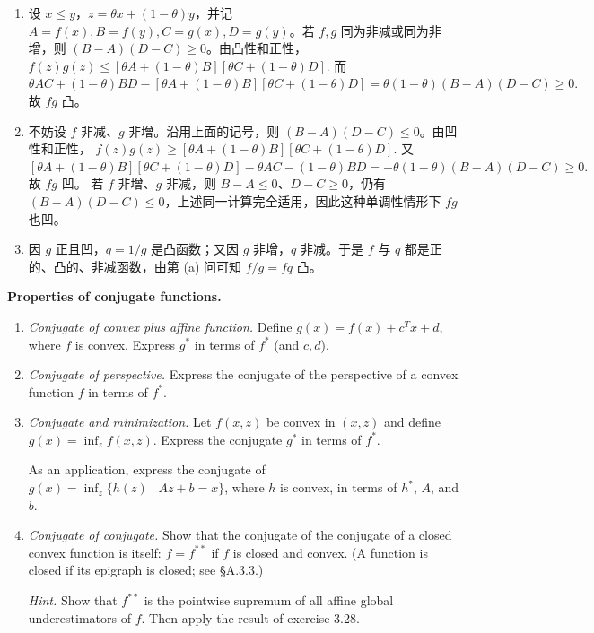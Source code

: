 \documentclass{ctexart}
\begin{document}
\begin{solution}
  \begin{enumerate}
    \item 设 $x\leq y$，$z=\theta x+(1-\theta)y$，并记
      $A=f(x),B=f(y),C=g(x),D=g(y)$。若 $f,g$ 同为非减或同为非增，则
      $(B-A)(D-C)\geq0$。由凸性和正性，
      \(
        f(z)g(z)\leq [\theta A+(1-\theta)B][\theta C+(1-\theta)D].
      \)
      而
      \(
        \theta AC+(1-\theta)BD
        -[\theta A+(1-\theta)B][\theta C+(1-\theta)D]
        =\theta(1-\theta)(B-A)(D-C)\geq0.
      \)
      故 $fg$ 凸。

    \item 不妨设 $f$ 非减、$g$ 非增。沿用上面的记号，则
      $(B-A)(D-C)\leq0$。由凹性和正性，
      \(
        f(z)g(z)\geq [\theta A+(1-\theta)B][\theta C+(1-\theta)D].
      \)
      又
      \(
        [\theta A+(1-\theta)B][\theta C+(1-\theta)D]
        -\theta AC-(1-\theta)BD
        =-\theta(1-\theta)(B-A)(D-C)\geq0.
      \)
      故 $fg$ 凹。
      若 $f$ 非增、$g$ 非减，则 $B-A\leq0$、$D-C\geq0$，仍有
      $(B-A)(D-C)\leq0$，上述同一计算完全适用，因此这种单调性情形下 $fg$ 也凹。

    \item 因 $g$ 正且凹，$q=1/g$ 是凸函数；又因 $g$ 非增，$q$ 非减。于是 $f$ 与
      $q$ 都是正的、凸的、非减函数，由第 (a) 问可知 $f/g=fq$ 凸。
  \end{enumerate}
\end{solution}

\begin{problem}\label{3.39}
  \textbf{Properties of conjugate functions.}

  \begin{enumerate}
    \item \textit{Conjugate of convex plus affine function.} Define
      $g(x)=f(x)+c^Tx+d$, where $f$ is convex. Express $g^*$ in terms of $f^*$
      (and $c,d$).

    \item \textit{Conjugate of perspective.} Express the conjugate of the perspective
      of a convex function $f$ in terms of $f^*$.

    \item \textit{Conjugate and minimization.} Let $f(x,z)$ be convex in $(x,z)$
      and define $g(x)=\inf_z f(x,z)$. Express the conjugate $g^*$ in terms of $f^*$.

      As an application, express the conjugate of
      $g(x)=\inf_z\{h(z)\mid Az+b=x\}$, where $h$ is convex, in terms of $h^*$,
      $A$, and $b$.

    \item \textit{Conjugate of conjugate.} Show that the conjugate of the conjugate
      of a closed convex function is itself: $f=f^{**}$ if $f$ is closed and convex.
      (A function is closed if its epigraph is closed; see \S A.3.3.)

      \textit{Hint.} Show that $f^{**}$ is the pointwise supremum of all affine global
      underestimators of $f$. Then apply the result of exercise 3.28.
  \end{enumerate}
\end{problem}
\end{document}
